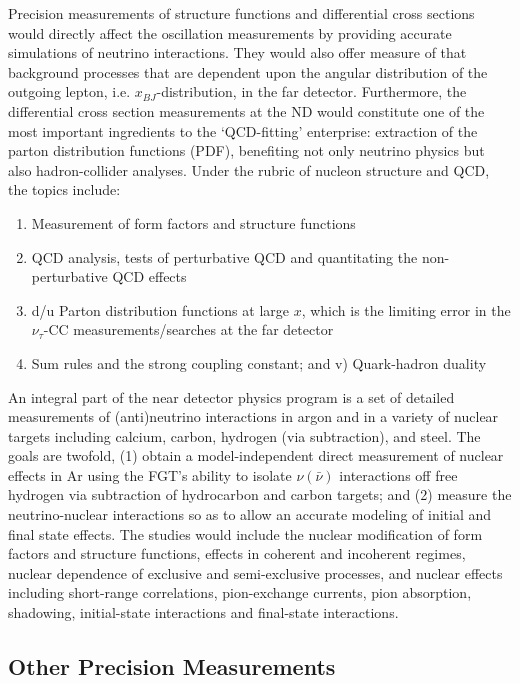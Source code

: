 Precision measurements of structure functions and differential cross
sections would directly affect the oscillation measurements by
providing accurate simulations of neutrino interactions. They would
also offer measure of that background processes that are dependent
upon the angular distribution of the outgoing lepton,
i.e. $x_{BJ}$-distribution, in the far detector.  Furthermore, the
differential cross section measurements at the ND would constitute one
of the most important ingredients to the `QCD-fitting' enterprise:
extraction of the parton distribution functions (PDF), benefiting not
only neutrino physics but also hadron-collider analyses.  Under the
rubric of nucleon structure and QCD, the topics include:
\begin{enumerate}
\item Measurement of form factors and structure functions
\item QCD analysis,  tests of perturbative QCD and quantitating the non-perturbative 
QCD effects
\item d/u Parton distribution functions at large $x$, which is the limiting error in the 
$\nu_\tau$-CC measurements/searches at the far detector
\item Sum rules and the strong coupling constant; and v) Quark-hadron duality
\end{enumerate}

An integral part of the near detector physics program is a set of
detailed measurements of (anti)neutrino interactions in argon and in a
variety of nuclear targets including calcium, carbon, hydrogen (via
subtraction), and steel.  The goals are
twofold, (1) obtain a model-independent direct measurement of nuclear
effects in Ar using the FGT's ability to isolate $\nu (\bar \nu)$
interactions off free hydrogen via subtraction of hydrocarbon and
carbon targets; and (2) measure the neutrino-nuclear interactions so as
to allow an accurate modeling of initial and final state effects. The
studies would include the nuclear modification of form factors and
structure functions, effects in coherent and incoherent regimes,
nuclear dependence of exclusive and semi-exclusive processes, and
nuclear effects including short-range correlations, pion-exchange
currents, pion absorption, shadowing, initial-state interactions and
final-state interactions.

\subsection{Other Precision Measurements}

